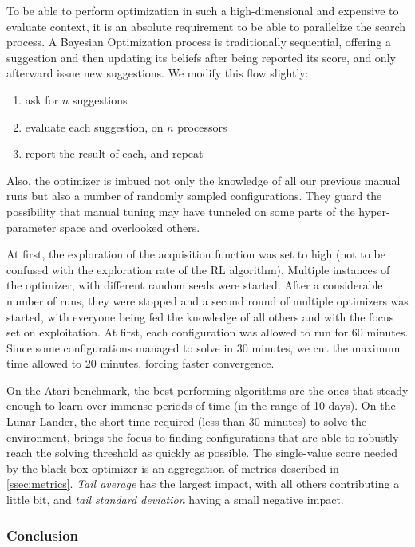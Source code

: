 \documentclass{article}
\begin{document}
To be able to perform optimization in such a high-dimensional and expensive to evaluate context, it is an absolute requirement to be able to parallelize the search process. A Bayesian Optimization process is traditionally sequential, offering a suggestion and then updating its beliefs after being reported its score, and only afterward issue new suggestions. We modify this flow slightly:

\begin{enumerate}
  \item ask for $n$ suggestions
  \item evaluate each suggestion, on $n$ processors
  \item report the result of each, and repeat
\end{enumerate}

Also, the optimizer is imbued not only the knowledge of all our previous manual runs but also a number of randomly sampled configurations. They guard the possibility that manual tuning may have tunneled on some parts of the hyper-parameter space and overlooked others. 

At first, the exploration of the acquisition function was set to high (not to be confused with the exploration rate of the RL algorithm). Multiple instances of the optimizer, with different random seeds were started. After a considerable number of runs, they were stopped and a second round of multiple optimizers was started, with everyone being fed the knowledge of all others and with the focus set on exploitation. At first, each configuration was allowed to run for 60 minutes. Since some configurations managed to solve in 30 minutes, we cut the maximum time allowed to 20 minutes, forcing faster convergence. 

On the Atari benchmark, the best performing algorithms are the ones that steady enough to learn over immense periods of time (in the range of 10 days). On the Lunar Lander, the short time required (less than 30 minutes) to solve the environment, brings the focus to finding configurations that are able to robustly reach the solving threshold as quickly as possible. The single-value score needed by the black-box optimizer is an aggregation of metrics described in \ref{ssec:metrics}. \textit{Tail average} has the largest impact, with all others contributing a little bit, and \textit{tail standard deviation} having a small negative impact.
 
\subsubsection{Conclusion}
\end{document}
